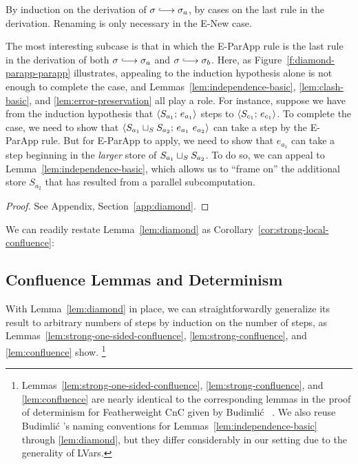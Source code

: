 \LemDiamond
\ifx\fulltr\undefined
\begin{proofsketch}
  By induction on the derivation of $\conf \parstepsto \conf_a$, by
  cases on the last rule in the derivation.
  Renaming is only necessary in the {\sc E-New} case.

  The most interesting
  subcase is that in which the {\sc E-ParApp} rule is the last rule in
  the derivation of both $\conf \parstepsto \conf_a$ and $\conf
  \parstepsto \conf_b$.
  Here, as Figure~\ref{f:diamond-parapp-parapp}
  illustrates, appealing to the induction hypothesis alone is not enough to
  complete the case, and Lemmas~\ref{lem:independence-basic}, 
  \ref{lem:clash-basic}, and \ref{lem:error-preservation} all play a role.  
  For instance, suppose we have from the induction hypothesis that
  $\langle S_{a_1};\, e_{a_1} \rangle$ steps to $\langle S_{c_1};\, e_{c_1} \rangle$.
  To complete the case, we need to show that
  $\langle S_{a_1} \sqcup_{S} S_{a_2};\, e_{a_1}~e_{a_2} \rangle$ can
  take a step by the {\sc E-ParApp} rule.
  But for {\sc E-ParApp} to apply,
  we need to show that $e_{a_1}$ can take a step beginning in the
  \emph{larger} store of $S_{a_1} \sqcup_{S} S_{a_2}$.  To do so, we
  can appeal to Lemma~\ref{lem:independence-basic}, which allows us to ``frame
  on'' the additional store $S_{a_2}$ that has resulted from a
  parallel subcomputation.
\end{proofsketch}
\else
\begin{proof}
See Appendix, Section~\ref{app:diamond}.
\end{proof}
\fi

\noindent We can readily restate Lemma~\ref{lem:diamond} as
Corollary~\ref{cor:strong-local-confluence}:

\LemStrongLocalConfluence

\subsection{Confluence Lemmas and Determinism}

With Lemma~\ref{lem:diamond} in place, we can straightforwardly
generalize its result to arbitrary numbers of steps by induction on the number of
steps, as Lemmas~\ref{lem:strong-one-sided-confluence},
\ref{lem:strong-confluence}, and \ref{lem:confluence} show.  
\footnote{Lemmas~\ref{lem:strong-one-sided-confluence},
\ref{lem:strong-confluence}, and \ref{lem:confluence}
  are nearly identical to the corresponding lemmas in
  the proof of determinism for Featherweight CnC given by
  Budimli\'c \etal~\cite{CnC}. We also reuse Budimli\'c \etal's naming
  conventions for Lemmas~\ref{lem:independence-basic} through
  \ref{lem:diamond}, but they
  differ considerably in our setting due to the generality of LVars.}

